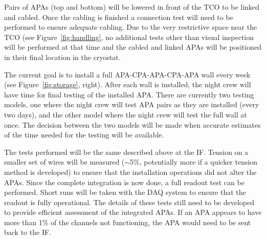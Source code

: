 Pairs of APAs (top and bottom) will be lowered in front of the TCO to be linked and cabled. Once the cabling is finished a connection test will need to be performed to ensure adequate cabling. Due to the very restrictive space near the TCO (see Figure~\ref{fig:handling}, no additional tests other than visual inspection will be performed at that time and the cabled and linked APAs will be positioned in their final location in the cryostat.


The current goal is to install a full APA-CPA-APA-CPA-APA wall every week (see Figure~\ref{fig:storage}, right). After each wall is installed, the night crew will have time for final testing of the installed APA. There are currently two testing models, one where the night crew will test APA pairs as they are installed (every two days), and the other model where the night crew will test the full wall at once. The decision between the two models will be made when accurate estimates of the time needed for the testing will be available.


The tests performed will be the same described above at the IF. Tension on a smaller set of wires will be measured ($\sim$5\%, potentially more if a quicker tension method is developed) to ensure that the installation operations did not alter the APAs. Since the complete integration is now done, a full readout test can be performed. Short runs will be taken with the DAQ system to ensure that the readout is fully operational. The details of these tests still need to be developed to provide efficient assessment of the integrated APAs. If an APA appears to have more than 1$\%$ of the channels not functioning, the APA would need to be sent back to the IF.

